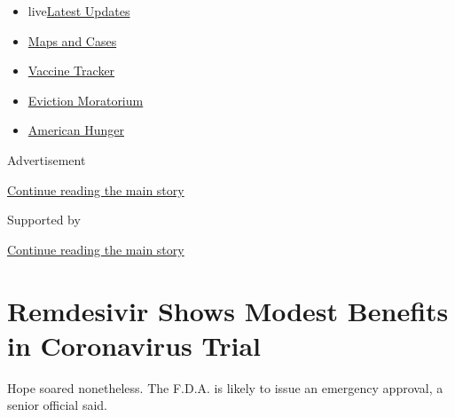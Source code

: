 \begin{itemize}
\tightlist
\item
  live\href{https://www.nytimes3xbfgragh.onion/2020/09/09/world/covid-19-coronavirus.html?name=styln-coronavirus-national\&region=TOP_BANNER\&block=storyline_menu_recirc\&action=click\&pgtype=Article\&impression_id=836c2d71-f2a2-11ea-913e-653d2f4141c6\&variant=undefined}{Latest
  Updates}
\item
  \href{https://www.nytimes3xbfgragh.onion/interactive/2020/us/coronavirus-us-cases.html?name=styln-coronavirus-national\&region=TOP_BANNER\&block=storyline_menu_recirc\&action=click\&pgtype=Article\&impression_id=836c2d72-f2a2-11ea-913e-653d2f4141c6\&variant=undefined}{Maps
  and Cases}
\item
  \href{https://www.nytimes3xbfgragh.onion/interactive/2020/science/coronavirus-vaccine-tracker.html?name=styln-coronavirus-national\&region=TOP_BANNER\&block=storyline_menu_recirc\&action=click\&pgtype=Article\&impression_id=836c5480-f2a2-11ea-913e-653d2f4141c6\&variant=undefined}{Vaccine
  Tracker}
\item
  \href{https://www.nytimes3xbfgragh.onion/2020/09/02/your-money/eviction-moratorium-covid.html?name=styln-coronavirus-national\&region=TOP_BANNER\&block=storyline_menu_recirc\&action=click\&pgtype=Article\&impression_id=836c5481-f2a2-11ea-913e-653d2f4141c6\&variant=undefined}{Eviction
  Moratorium}
\item
  \href{https://www.nytimes3xbfgragh.onion/interactive/2020/09/02/magazine/food-insecurity-hunger-us.html?name=styln-coronavirus-national\&region=TOP_BANNER\&block=storyline_menu_recirc\&action=click\&pgtype=Article\&impression_id=836c5482-f2a2-11ea-913e-653d2f4141c6\&variant=undefined}{American
  Hunger}
\end{itemize}

Advertisement

\protect\hyperlink{after-top}{Continue reading the main story}

Supported by

\protect\hyperlink{after-sponsor}{Continue reading the main story}

\hypertarget{remdesivir-shows-modest-benefits-in-coronavirus-trial}{%
\section{Remdesivir Shows Modest Benefits in Coronavirus
Trial}\label{remdesivir-shows-modest-benefits-in-coronavirus-trial}}

Hope soared nonetheless. The F.D.A. is likely to issue an emergency
approval, a senior official said.

